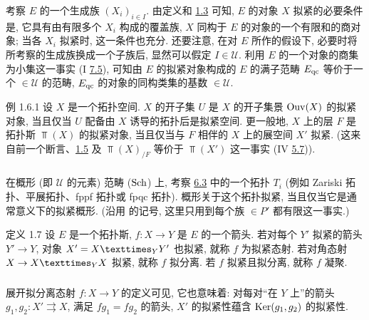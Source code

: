 \subsubsection{}
考察 $E$ 的一个生成族 $(X_i)_{i \in I}$.
由定义和 \hyperref[VI.prop1.3]{1.3} 可知,
$E$ 的对象 $X$ 拟紧的必要条件是,
它具有由有限多个 $X_i$ 构成的覆盖族,
\ie $X$ 同构于 $E$ 的对象的一个有限和的商对象;
当各 $X_i$ 拟紧时, 这一条件也充分.
还要注意, 在对 $E$ 所作的假设下,
必要时将所考察的生成族换成一个子族后,
显然可以假定 $I \in 𝒰$.
利用 $E$ 的一个对象的商集为小集这一事实
(I \hyperref[I.cor7.5]{7.5}),
可知由 $E$ 的拟紧对象构成的 $E$ 的满子范畴 $E_{\mathrm{qc}}$
等价于一个 $\in 𝒰$ 的范畴,
\ie $E_{\mathrm{qc}}$ 的对象的同构类集的基数 $\in 𝒰$.

\begin{enonce*}[remark]{例 1.6.1}
设 $X$ 是一个拓扑空间.
$X$ 的开子集 $U$ 是 $X$ 的开子集景 $\operatorname{Ouv}(X)$ 的拟紧对象,
当且仅当 $U$ 配备由 $X$ 诱导的拓扑后是拟紧空间.
更一般地, $X$ 上的层 $F$ 是拓扑斯 $\Top(X)$ 的拟紧对象,
当且仅当与 $F$ 相伴的 $X$ 上的展空间 $X'$ 拟紧.
(这来自前一个断言、\hyperref[VI.rem1.5.1]{1.5}
及 $\Top (X)_{/F}$ 等价于 $\Top(X')$ 这一事实
(IV \hyperref[IV.subsec5.7]{5.7})).
\end{enonce*}

\setcounter{subsection}{6}
\setcounter{subsubsection}{1}
\subsubsection{}
在\pageoriginale{}概形 (即 $𝒰$ 的元素) 范畴 ($\operatorname{Sch}$) 上,
考察 \cite{sga4.exp.VI.bib.6} \hyperref[VI.def6.3]{6.3} 中的一个拓扑 $T_i$
(例如 Zariski 拓扑、平展拓扑、fppf 拓扑或 fpqc 拓扑).
概形关于这个拓扑拟紧,
当且仅当它是通常意义下的拟紧概形.
(沿用 \loccit{} 的记号, 这里只用到每个族 $\in P'$ 都有限这一事实.)

\begin{enonce*}{定义 1.7}
设 $E$ 是一个拓扑斯, $f : X \to Y$ 是 $E$ 的一个箭头.
若对每个 $Y'$ 拟紧的箭头 $Y'\to Y$,
对象 $X'= \fprod{X}{Y'}{Y}$ 也拟紧,
就称 $f$ 为拟紧态射.
若对角态射 $X \to \fprod{X}{X}{Y}$ 拟紧,
就称 $f$ 拟分离.
若 $f$ 拟紧且拟分离, 就称 $f$ 凝聚.
\end{enonce*}

\setcounter{subsection}{7}
\setcounter{subsubsection}{0}
\subsubsection{}
展开拟分离态射 $f : X \to Y$ 的定义可见,
它也意味着: 对每对“在 $Y$ 上”的箭头
$g_1, g_2 : X'\rightrightarrows X$,
\ie 满足 $fg_1 = fg_2$ 的箭头,
$X'$ 的拟紧性蕴含 $\operatorname{Ker}(g_1, g_2)$ 的拟紧性.

